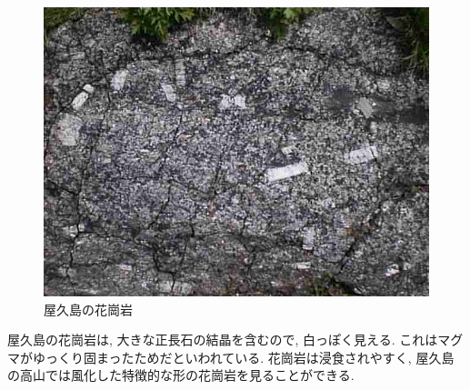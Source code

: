 \documentclass[10pt,titlepage,a5paper]{ltjsbook}
\begin{document}
    \vspace{2em}
    \begin{tcolorbox}[title=コラム:屋久島の花崗岩,width=\textwidth]
      \begin{minipage}{0.34\columnwidth}
        \begin{figure}[H]
          \centering
          \includegraphics[width=\columnwidth]{kakougan.jpg}
          \caption{屋久島の花崗岩}
          \label{fig:yakushima_granite}
        \end{figure}
      \end{minipage}
      \hfill
      \begin{minipage}{0.64\columnwidth}
      屋久島の花崗岩は, 大きな正長石の結晶を含むので, 白っぽく見える. これはマグマがゆっくり固まったためだといわれている. 花崗岩は浸食されやすく, 屋久島の高山では風化した特徴的な形の花崗岩\footnotemark を見ることができる. 
      \end{minipage}
    \end{tcolorbox}
\end{document}
